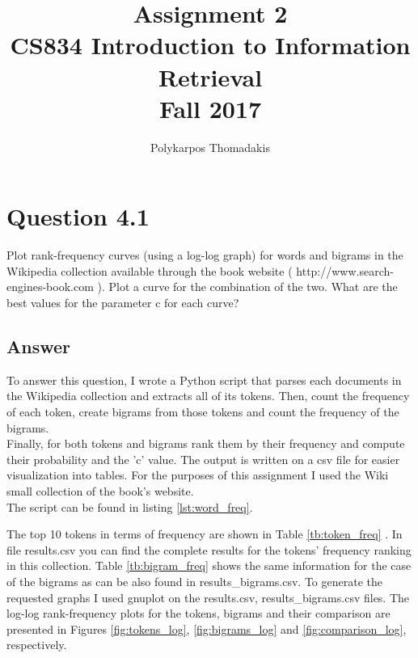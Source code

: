 \documentclass{article}
\author{Polykarpos Thomadakis}
\title{Assignment 2 \\
	\large CS834 Introduction to Information Retrieval\\Fall 2017}
\begin{document}
	\maketitle
	\section*{Question 4.1}
	Plot rank-frequency curves (using a log-log graph) for words and bigrams in
	the Wikipedia collection available through the book website ( http://www.search-
	engines-book.com ). Plot a curve for the combination of the two. What are the best
	values for the parameter c for each curve?
	\subsection*{Answer}
	To answer this question, I wrote a Python script that parses each documents in the Wikipedia collection and extracts all of its tokens. Then, count the frequency of each token, create bigrams from those tokens and count the frequency of the bigrams.\\ Finally, for both tokens and bigrams rank them by their frequency and compute their probability and the 'c' value.
	The output is written on a csv file for easier visualization into tables. For the purposes of this assignment I used the Wiki small collection of the book's website. \\The script can be found in listing \ref{lst:word_freq}.
	
	
	
	The top 10 tokens in terms of frequency are shown in Table \ref{tb:token_freq} . In file results.csv you can find the complete results for the tokens' frequency ranking in this collection. Table \ref{tb:bigram_freq} shows the same information for the case of the bigrams as can be also found in results\_bigrams.csv. To generate the requested graphs I used gnuplot on the results.csv, results\_bigrams.csv files. The log-log rank-frequency plots for the tokens, bigrams and their comparison are presented in Figures \ref{fig:tokens_log}, \ref{fig:bigrams_log} and \ref{fig:comparison_log}, respectively.
	
\end{document}
